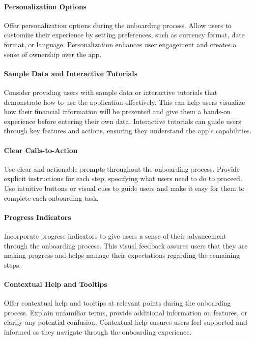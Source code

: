 \paragraph{Personalization Options}
Offer personalization options during the onboarding process. Allow users to 
customize their experience by setting preferences, such as currency format, date format, or language. Personalization 
enhances user engagement and creates a sense of ownership over the app.

\paragraph{Sample Data and Interactive Tutorials}
Consider providing users with sample data or interactive tutorials that 
demonstrate how to use the application effectively. This can help users visualize how their financial information 
will be presented and give them a hands-on experience before entering their own data. Interactive tutorials can 
guide users through key features and actions, ensuring they understand the app's capabilities.

\paragraph{Clear Calls-to-Action}
Use clear and actionable prompts throughout the onboarding process. Provide explicit 
instructions for each step, specifying what users need to do to proceed. Use intuitive buttons or visual cues 
to guide users and make it easy for them to complete each onboarding task.

\paragraph{Progress Indicators}
Incorporate progress indicators to give users a sense of their advancement through the onboarding 
process. This visual feedback assures users that they are making progress and helps manage their expectations regarding 
the remaining steps.

\paragraph{Contextual Help and Tooltips}
Offer contextual help and tooltips at relevant points during the onboarding process. 
Explain unfamiliar terms, provide additional information on features, or clarify any potential confusion. Contextual 
help ensures users feel supported and informed as they navigate through the onboarding experience.

